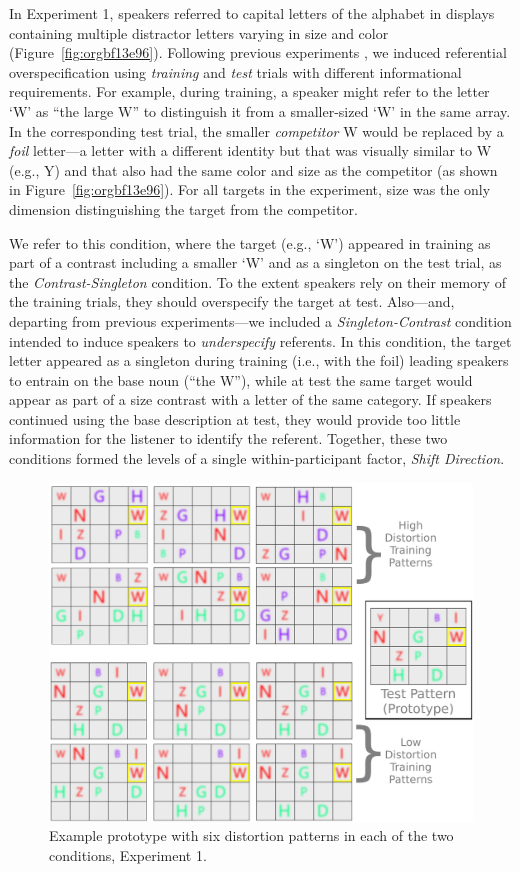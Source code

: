 \documentclass[natbib,man,a4paper]{apa6}
\begin{document}
In Experiment 1, speakers referred to capital letters of the alphabet in displays containing multiple distractor letters varying in size and color (Figure~\ref{fig:orgbf13e96}). Following previous experiments \citep{brennanclark96,GannBarr2014}, we induced referential overspecification using \emph{training} and \emph{test} trials with different informational requirements. For example, during training, a speaker might refer to the letter `W' as ``the large W'' to distinguish it from a smaller-sized `W' in the same array. In the corresponding test trial, the smaller \emph{competitor} W would be replaced by a \emph{foil} letter---a letter with a different identity but that was visually similar to W (e.g., Y) and that also had the same color and size as the competitor (as shown in Figure~\ref{fig:orgbf13e96}). For all targets in the experiment, size was the only dimension distinguishing the target from the competitor.

We refer to this condition, where the target (e.g., `W') appeared in training as part of a contrast including a smaller `W' and as a singleton on the test trial, as the  \emph{Contrast-Singleton} condition. To the extent speakers rely on their memory of the training trials, they should overspecify the target at test. Also---and, departing from previous experiments---we included a \emph{Singleton-Contrast} condition intended to induce speakers to \emph{underspecify} referents. In this condition, the target letter appeared as a singleton during training (i.e., with the foil) leading speakers to entrain on the base noun (``the W''), while at test the same target would appear as part of a size contrast with a letter of the same category. If speakers continued using the base description at test, they would provide too little information for the listener to identify the referent.  Together, these two conditions formed the levels of a single within-participant factor, \emph{Shift Direction}.

\begin{figure}[htbp]
\centering
\includegraphics[width=.9\linewidth]{figs/Exp1_HvL.png}
\caption{\label{fig:orge396722}
Example prototype with six distortion patterns in each of the two conditions, Experiment 1.}
\end{figure}
\end{document}
